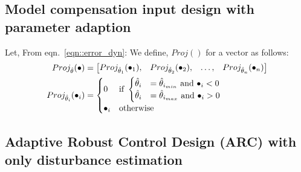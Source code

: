 \subsection{Model compensation input design with parameter adaption}
Let, From eqn.~\ref{eqn::error_dyn}:
We define,  $Proj()$ for a vector as follows:
\begin{align*}
    Proj_{\hat \theta} (\bullet) &= \begin{bmatrix} Proj_{\hat \theta_1}(\bullet_1), &
                                        Proj_{\hat \theta_2}(\bullet_2), &
                                        \hdots, &
                                        Proj_{\hat \theta_n}(\bullet_n) \end{bmatrix}\\
    Proj_{\hat \theta_i}(\bullet_i) &= \begin{cases}
        0 & \text{if } \begin{cases}
                        \hat \theta_i &= \hat \theta_{i_{min}} \text{  and  } \bullet_i < 0\\
                        \hat \theta_i &= \hat \theta_{i_{max}} \text{  and  } \bullet_i > 0\\
                       \end{cases}\\
        \bullet_i & \text{otherwise}
    \end{cases}
\end{align*}

\subsection{Adaptive Robust Control Design (ARC) with only disturbance estimation}
